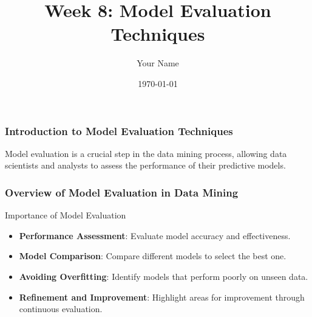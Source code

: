 \documentclass{beamer}
\title{Week 8: Model Evaluation Techniques}
\author{Your Name}
\institute{Your Institution}
\date{\today}
\begin{document}
\frame{\titlepage}

\begin{frame}[fragile]
    \frametitle{Introduction to Model Evaluation Techniques}
    Model evaluation is a crucial step in the data mining process, allowing data scientists and analysts to assess the performance of their predictive models.
\end{frame}

\begin{frame}[fragile]
    \frametitle{Overview of Model Evaluation in Data Mining}
    \begin{block}{Importance of Model Evaluation}
        \begin{itemize}
            \item \textbf{Performance Assessment}: Evaluate model accuracy and effectiveness.
            \item \textbf{Model Comparison}: Compare different models to select the best one.
            \item \textbf{Avoiding Overfitting}: Identify models that perform poorly on unseen data.
            \item \textbf{Refinement and Improvement}: Highlight areas for improvement through continuous evaluation.
        \end{itemize}
    \end{block}
\end{frame}
\end{document}
